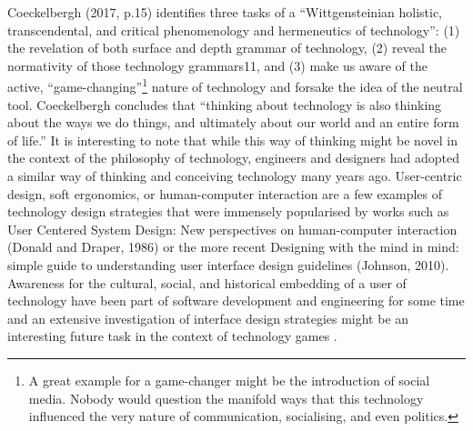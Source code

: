 Coeckelbergh (2017, p.15) identifies three tasks of a “Wittgensteinian
holistic, transcendental, and critical phenomenology and hermeneutics of
technology”: (1) the revelation of both surface and depth grammar of
technology, (2) reveal the normativity of those technology
grammars11, and (3) make us
aware of the active, “game-changing”\footnote{A great example for a
game-changer might be the introduction of social media. Nobody
would question the manifold ways that this technology influenced the
very nature of communication, socialising, and even politics.} nature
of technology and forsake the idea of the neutral tool. Coeckelbergh
concludes that “thinking about technology is also thinking about the
ways we do things, and ultimately about our world and an entire form of
life.” It is interesting to note that while this way of thinking might
be novel in the context of the philosophy of technology, engineers and
designers had adopted a similar way of thinking and conceiving
technology many years ago. User-centric design, soft ergonomics, or
human-computer interaction are a few examples of technology design
strategies that were immensely popularised by works such as User
Centered System Design: New perspectives on human-computer interaction
(Donald and Draper, 1986) or the more recent Designing with the
mind in mind: simple guide to understanding user interface design
guidelines (Johnson, 2010). Awareness for the cultural, social, and
historical embedding of a user of technology have been part of software
development and engineering for some time and an extensive investigation
of interface design strategies might be an interesting future task in
the context of technology games .
